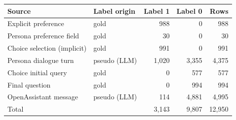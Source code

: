 \begin{tabular}{llrrr}
\toprule
Source & Label origin & Label 1 & Label 0 & Rows \\
\midrule
Explicit preference & gold & 988 & 0 & 988 \\
Persona preference field & gold & 30 & 0 & 30 \\
Choice selection (implicit) & gold & 991 & 0 & 991 \\
Persona dialogue turn & pseudo (LLM) & 1,020 & 3,355 & 4,375 \\
Choice initial query & gold & 0 & 577 & 577 \\
Final question & gold & 0 & 994 & 994 \\
OpenAssistant message & pseudo (LLM) & 114 & 4,881 & 4,995 \\
\midrule Total & & 3,143 & 9,807 & 12,950 \\
\bottomrule
\end{tabular}
